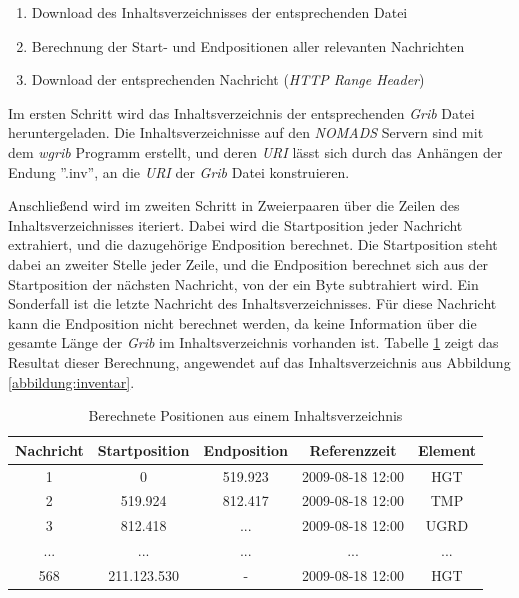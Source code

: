 \begin{enumerate}
\item Download des Inhaltsverzeichnisses der entsprechenden Datei
\item Berechnung der Start- und Endpositionen aller relevanten Nachrichten
\item Download der entsprechenden Nachricht (\textit{HTTP Range Header})
\end{enumerate}

Im ersten Schritt wird das Inhaltsverzeichnis der entsprechenden
\textit{Grib} Datei heruntergeladen. Die Inhaltsverzeichnisse auf den
\textit{NOMADS} Servern sind mit dem \textit{wgrib} Programm erstellt,
und deren \textit{URI} lässt sich durch das Anhängen der Endung
''.inv'', an die \textit{URI} der \textit{Grib} Datei konstruieren.

Anschließend wird im zweiten Schritt in Zweierpaaren über die Zeilen
des Inhaltsverzeichnisses iteriert. Dabei wird die Startposition jeder
Nachricht extrahiert, und die dazugehörige Endposition berechnet. Die
Startposition steht dabei an zweiter Stelle jeder Zeile, und die
Endposition berechnet sich aus der Startposition der nächsten
Nachricht, von der ein Byte subtrahiert wird. Ein Sonderfall ist die
letzte Nachricht des Inhaltsverzeichnisses. Für diese Nachricht kann
die Endposition nicht berechnet werden, da keine Information über die
gesamte Länge der \textit{Grib} im Inhaltsverzeichnis vorhanden
ist. Tabelle \ref{tab:inhaltsverzeichnis_mit_positionen} zeigt das
Resultat dieser Berechnung, angewendet auf das Inhaltsverzeichnis aus
Abbildung \ref{abbildung:inventar}.

\begin{table}[h]
  \centering
  {\sf
    \footnotesize
    \begin{longtable}{@{}ccccc}
      \toprule
      \textbf{Nachricht} & \textbf{Startposition} & \textbf{Endposition} & \textbf{Referenzzeit} & \textbf{Element} \\
      \midrule
      1 & 0 & 519.923 & 2009-08-18 12:00 & HGT \\
      2 & 519.924 & 812.417 & 2009-08-18 12:00 & TMP \\
      3 & 812.418 & ... & 2009-08-18 12:00 & UGRD \\
      ... & ... & ... & ... & ... \\
      568 & 211.123.530 & - & 2009-08-18 12:00 & HGT \\
      \bottomrule
    \end{longtable}
  }

  \caption{Berechnete Positionen aus einem Inhaltsverzeichnis}
  \label{tab:inhaltsverzeichnis_mit_positionen}

\end{table}

